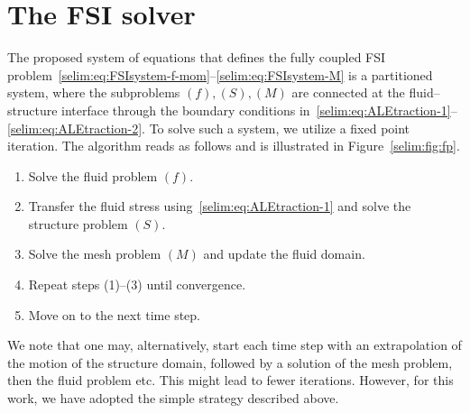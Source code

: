 \section{The FSI solver}
\label{selim:sec:primalsolver}

The proposed system of equations that defines the fully coupled FSI
problem~\eqref{selim:eq:FSIsystem-f-mom}--\eqref{selim:eq:FSIsystem-M} is a partitioned system, where the
subproblems $(f),(S),(M)$ are connected at the fluid--structure interface
through the boundary conditions in~\eqref{selim:eq:ALEtraction-1}--\eqref{selim:eq:ALEtraction-2}. To
solve such a system, we utilize a fixed point iteration. The algorithm
reads as follows and is illustrated in Figure~\ref{selim:fig:fp}.
\begin{enumerate}
  \item Solve the fluid problem $(f)$.

  \item Transfer the fluid stress using~\eqref{selim:eq:ALEtraction-1}
  and solve the structure problem $(S)$.

  \item Solve the mesh problem $(M)$ and update the fluid domain.

  \item Repeat steps (1)--(3) until convergence.

  \item Move on to the next time step.
\end{enumerate}
We note that one may, alternatively, start each time step with an
extrapolation of the motion of the structure domain, followed by a
solution of the mesh problem, then the fluid problem etc. This might
lead to fewer iterations. However, for this work, we have adopted the
simple strategy described above.

